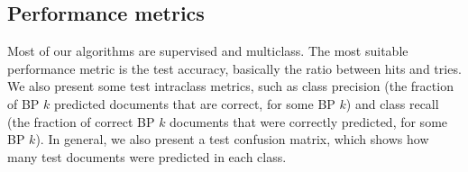 \subsection{Performance metrics}

    Most of our algorithms are supervised and multiclass. The most suitable performance metric is the test accuracy, basically the ratio between hits and tries. We also present some test intraclass metrics, such as class precision (the fraction of BP $k$ predicted documents that are correct, for some BP $k$) and class recall (the fraction of correct BP $k$ documents that were correctly predicted, for some BP $k$). In general, we also present a test confusion matrix, which shows how many test documents were predicted in each class.
